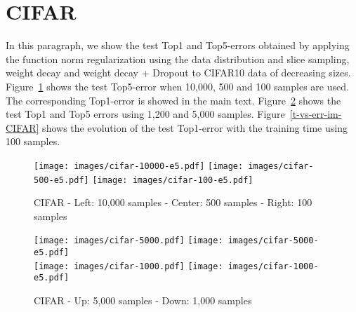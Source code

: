 \documentclass{article}
\begin{document}
\section{CIFAR}
In this paragraph, we show the test Top1 and Top5-errors obtained by applying the function norm regularization using the data distribution and slice sampling, weight decay and weight decay + Dropout to CIFAR10 data of decreasing sizes. 
Figure~\ref{sup-reg-im-CIFAR-e5} shows the test Top5-error when 10,000, 500 and 100 samples are used. The corresponding Top1-error is showed in the main text. Figure~\ref{sup-reg-im-CIFAR} shows the test Top1 and Top5 errors using 1,200 and 5,000 samples. Figure~\ref{t-vs-err-im-CIFAR} shows the evolution of the test Top1-error with the training time using 100 samples.
\begin{figure}[ht!]
\texttt{[image: images/cifar-10000-e5.pdf]} \hfill 
\texttt{[image: images/cifar-500-e5.pdf]} \hfill
\texttt{[image: images/cifar-100-e5.pdf]}
\caption{CIFAR - Left: 10,000 samples - Center: 500 samples - Right: 100 samples}
\label{sup-reg-im-CIFAR-e5}
\end{figure}


\begin{figure}[ht!]
\texttt{[image: images/cifar-5000.pdf]} \hfill 
\texttt{[image: images/cifar-5000-e5.pdf]} \\
\texttt{[image: images/cifar-1000.pdf]} \hfill
\texttt{[image: images/cifar-1000-e5.pdf]}
\caption{CIFAR - Up: 5,000 samples - Down: 1,000 samples}
\label{sup-reg-im-CIFAR}
\end{figure}
\end{document}
